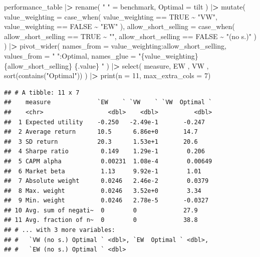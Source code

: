 \documentclass[
]{krantz}
\newenvironment{Shaded}{\begin{snugshade}}{\end{snugshade}}
\newcommand{\AttributeTok}[1]{\textcolor[rgb]{0.61,0.61,0.61}{#1}}
\newcommand{\ConstantTok}[1]{\textcolor[rgb]{0,0,0}{#1}}
\newcommand{\DecValTok}[1]{\textcolor[rgb]{0.06,0.06,0.06}{#1}}
\newcommand{\ErrorTok}[1]{\textcolor[rgb]{0.14,0.14,0.14}{\textbf{#1}}}
\newcommand{\FunctionTok}[1]{\textcolor[rgb]{0,0,0}{#1}}
\newcommand{\NormalTok}[1]{#1}
\newcommand{\OtherTok}[1]{\textcolor[rgb]{0.37,0.37,0.37}{#1}}
\newcommand{\SpecialCharTok}[1]{\textcolor[rgb]{0,0,0}{#1}}
\newcommand{\StringTok}[1]{\textcolor[rgb]{0.5,0.5,0.5}{#1}}
\begin{document}
\begin{Shaded}
\begin{Highlighting}[]
\NormalTok{performance\_table }\SpecialCharTok{|}\ErrorTok{\textgreater{}}
  \FunctionTok{rename}\NormalTok{(}
    \StringTok{" "} \OtherTok{=}\NormalTok{ benchmark,}
    \AttributeTok{Optimal =}\NormalTok{ tilt}
\NormalTok{  ) }\SpecialCharTok{|}\ErrorTok{\textgreater{}}
  \FunctionTok{mutate}\NormalTok{(}
    \AttributeTok{value\_weighting =} \FunctionTok{case\_when}\NormalTok{(}
\NormalTok{      value\_weighting }\SpecialCharTok{==} \ConstantTok{TRUE} \SpecialCharTok{\textasciitilde{}} \StringTok{"VW"}\NormalTok{,}
\NormalTok{      value\_weighting }\SpecialCharTok{==} \ConstantTok{FALSE} \SpecialCharTok{\textasciitilde{}} \StringTok{"EW"}
\NormalTok{    ),}
    \AttributeTok{allow\_short\_selling =} \FunctionTok{case\_when}\NormalTok{(}
\NormalTok{      allow\_short\_selling }\SpecialCharTok{==} \ConstantTok{TRUE} \SpecialCharTok{\textasciitilde{}} \StringTok{""}\NormalTok{,}
\NormalTok{      allow\_short\_selling }\SpecialCharTok{==} \ConstantTok{FALSE} \SpecialCharTok{\textasciitilde{}} \StringTok{"(no s.)"}
\NormalTok{    )}
\NormalTok{  ) }\SpecialCharTok{|}\ErrorTok{\textgreater{}}
  \FunctionTok{pivot\_wider}\NormalTok{(}
    \AttributeTok{names\_from =}\NormalTok{ value\_weighting}\SpecialCharTok{:}\NormalTok{allow\_short\_selling,}
    \AttributeTok{values\_from =} \StringTok{" "}\SpecialCharTok{:}\NormalTok{Optimal,}
    \AttributeTok{names\_glue =} \StringTok{"\{value\_weighting\} \{allow\_short\_selling\} \{.value\} "}
\NormalTok{  ) }\SpecialCharTok{|}\ErrorTok{\textgreater{}}
  \FunctionTok{select}\NormalTok{(}
\NormalTok{    measure,}
    \StringTok{\textasciigrave{}}\AttributeTok{EW    }\StringTok{\textasciigrave{}}\NormalTok{,}
    \StringTok{\textasciigrave{}}\AttributeTok{VW    }\StringTok{\textasciigrave{}}\NormalTok{,}
    \FunctionTok{sort}\NormalTok{(}\FunctionTok{contains}\NormalTok{(}\StringTok{"Optimal"}\NormalTok{))}
\NormalTok{  ) }\SpecialCharTok{|}\ErrorTok{\textgreater{}}
  \FunctionTok{print}\NormalTok{(}\AttributeTok{n =} \DecValTok{11}\NormalTok{, }\AttributeTok{max\_extra\_cols =} \DecValTok{7}\NormalTok{)}
\end{Highlighting}
\end{Shaded}

\begin{verbatim}
## # A tibble: 11 x 7
##    measure             `EW    ` `VW    ` `VW  Optimal `
##    <chr>                  <dbl>    <dbl>          <dbl>
##  1 Expected utility    -0.250   -2.49e-1       -0.247  
##  2 Average return      10.5      6.86e+0       14.7    
##  3 SD return           20.3      1.53e+1       20.6    
##  4 Sharpe ratio         0.149    1.29e-1        0.206  
##  5 CAPM alpha           0.00231  1.08e-4        0.00649
##  6 Market beta          1.13     9.92e-1        1.01   
##  7 Absolute weight      0.0246   2.46e-2        0.0379 
##  8 Max. weight          0.0246   3.52e+0        3.34   
##  9 Min. weight          0.0246   2.78e-5       -0.0327 
## 10 Avg. sum of negati~  0        0             27.9    
## 11 Avg. fraction of n~  0        0             38.8    
## # ... with 3 more variables:
## #   `VW (no s.) Optimal ` <dbl>, `EW  Optimal ` <dbl>,
## #   `EW (no s.) Optimal ` <dbl>
\end{verbatim}
\end{document}
